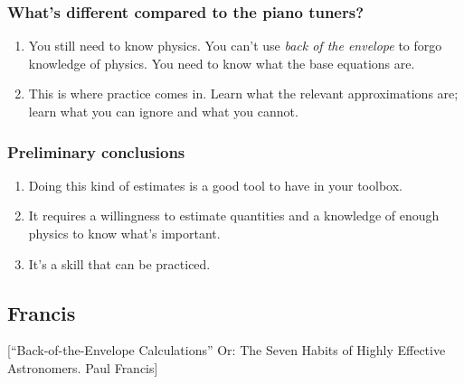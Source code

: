 \subsubsection{What's different compared to the piano tuners?}

\begin{enumerate}
\item You still need to know physics. You can't use \emph{back of the envelope} to forgo knowledge of physics. You need to know what the base equations are.
%
\item This is where practice comes in. Learn what the relevant approximations are; learn what you can ignore and what you cannot.
\end{enumerate}


\subsubsection{Preliminary conclusions}
\begin{enumerate}
\item Doing this kind of estimates is a good tool to have in your toolbox.
%
\item It requires a willingness to estimate quantities and a knowledge of enough physics to know what's important.
%
\item It's a skill that can be practiced.
\end{enumerate}


\subsection{Francis}
[``Back-of-the-Envelope Calculations'' Or: The Seven Habits of Highly Effective Astronomers. Paul Francis]


